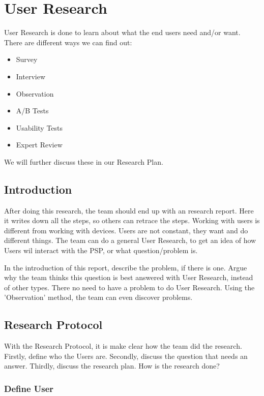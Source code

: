 \documentclass[10pt]{report}
\begin{document}
\section{User Research}

User Research is done to learn about what the end users need and/or want. There are different ways we can find out:

\begin{itemize}
	\item Survey
	\item Interview
	\item Observation
	\item A/B Tests
	\item Usability Tests
	\item Expert Review
\end{itemize}

We will further discuss these in our Research Plan.

\subsection{Introduction}

After doing this research, the team should end up with an research report. Here it writes down all the steps, so others can retrace the steps. Working with users is different from working with devices. Users are not constant, they want and do different things. The team can do a general User Research, to get an idea of how Users wil interact with the PSP, or what question/problem is.

In the introduction of this report, describe the problem, if there is one. Argue why the team thinks this question is best answered with User Research, instead of other types. There no need to have a problem to do User Research. Using the 'Observation' method, the team can even discover problems.

\subsection{Research Protocol}

With the Research Protocol, it is make clear how the team did the research. Firstly, define who the Users are. Secondly, discuss the question that needs an answer. Thirdly, discuss the research plan. How is the research done?

\subsubsection{Define User}
\end{document}

